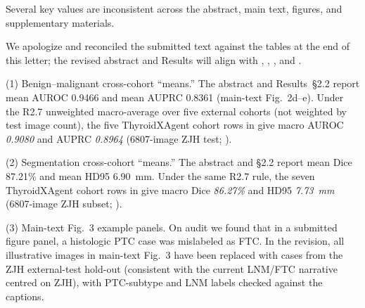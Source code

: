 \begin{reviewercomment}
Several key values are inconsistent across the abstract, main text, figures, and supplementary materials.
\end{reviewercomment}
\begin{authorresponse}
We apologize and reconciled the submitted text against the tables at the end of this letter; the revised abstract and Results will align with , , , and .\par
(1) Benign--malignant cross-cohort ``means.'' The abstract and Results~§2.2 report mean AUROC 0.9466 and mean AUPRC 0.8361 (main-text Fig.~2d--e). Under the R2.7 unweighted macro-average over five external cohorts (not weighted by test image count), the five ThyroidXAgent cohort rows in  give macro AUROC \emph{0.9080} and AUPRC \emph{0.8964} (6807-image ZJH test; ).\par
(2) Segmentation cross-cohort ``means.'' The abstract and §2.2 report mean Dice 87.21\% and mean HD95 6.90~mm. Under the same R2.7 rule, the seven ThyroidXAgent cohort rows in  give macro Dice \emph{86.27\%} and HD95 \emph{7.73~mm} (6807-image ZJH subset; ).\par
(3) Main-text Fig.~3 example panels. On audit we found that in a submitted figure panel, a histologic PTC case was mislabeled as FTC. In the revision, all illustrative images in main-text Fig.~3 have been replaced with cases from the ZJH external-test hold-out (consistent with the current LNM/FTC narrative centred on ZJH), with PTC-subtype and LNM labels checked against the captions.\par
\par
\end{authorresponse}

